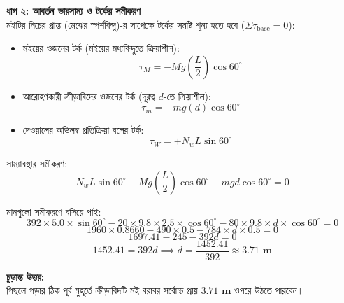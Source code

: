 \documentclass[12pt, a4paper]{article}
\begin{document}
\begin{tcolorbox}[solutionbox={সমাধান (Solution)}]
\begin{center}
\end{center}
\vspace{1em}

\vspace{0.5em}
\noindent
\textbf{ধাপ ২: আবর্তন ভারসাম্য ও টর্কের সমীকরণ} \\
মইটির নিচের প্রান্ত (মেঝের স্পর্শবিন্দু)-র সাপেক্ষে টর্কের সমষ্টি শূন্য হতে হবে ($\Sigma \tau_{\text{base}} = 0$):
\begin{itemize}[leftmargin=*, parsep=0.4ex]
    \item মইয়ের ওজনের টর্ক (মইয়ের মধ্যবিন্দুতে ক্রিয়াশীল): 
    $$\tau_M = - M g \left(\frac{L}{2}\right) \cos 60^\circ$$
    \item আরোহণকারী ক্রীড়াবিদের ওজনের টর্ক (দূরত্ব $d$-তে ক্রিয়াশীল): 
    $$\tau_m = - m g (d) \cos 60^\circ$$
    \item দেওয়ালের অভিলম্ব প্রতিক্রিয়া বলের টর্ক: 
    $$\tau_W = + N_w L \sin 60^\circ$$
\end{itemize}

সাম্যাবস্থার সমীকরণ:
$$N_w L \sin 60^\circ - M g \left(\frac{L}{2}\right) \cos 60^\circ - m g d \cos 60^\circ = 0$$

মানগুলো সমীকরণে বসিয়ে পাই:
$$392 \times 5.0 \times \sin 60^\circ - 20 \times 9.8 \times 2.5 \times \cos 60^\circ - 80 \times 9.8 \times d \times \cos 60^\circ = 0$$ 
$$1960 \times 0.8660 - 490 \times 0.5 - 784 \times d \times 0.5 = 0$$ 
$$1697.41 - 245 - 392 d = 0$$ 
$$1452.41 = 392 d \implies d = \frac{1452.41}{392} \approx \mathbf{3.71\text{ m}}$$

\vspace{1em}
\begin{tcolorbox}[answerbox]
\textbf{চূড়ান্ত উত্তর:} \\পিছলে পড়ার ঠিক পূর্ব মুহূর্তে ক্রীড়াবিদটি মই বরাবর সর্বোচ্চ প্রায় $\mathbf{3.71\text{ m}}$ ওপরে উঠতে পারবেন।
\end{tcolorbox}
\end{tcolorbox}
\end{document}
